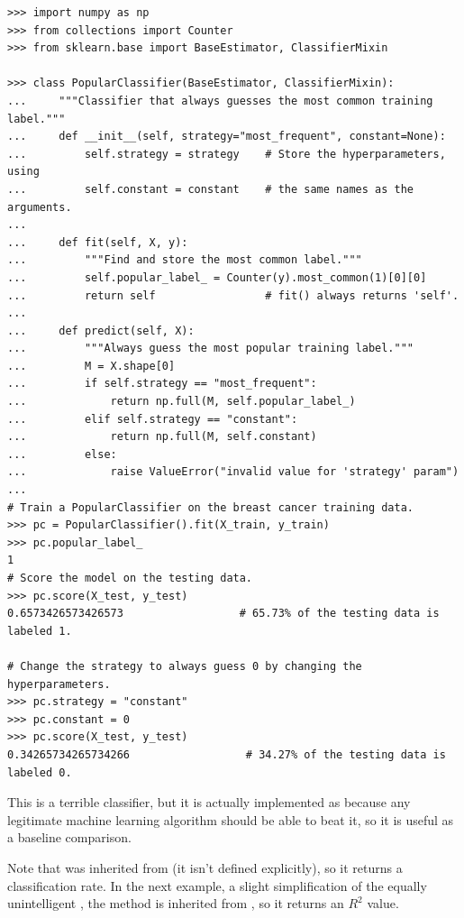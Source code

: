\begin{lstlisting}
>>> import numpy as np
>>> from collections import Counter
>>> from sklearn.base import BaseEstimator, ClassifierMixin

>>> class PopularClassifier(BaseEstimator, ClassifierMixin):
...     """Classifier that always guesses the most common training label."""
...     def __init__(self, strategy="most_frequent", constant=None):
...         self.strategy = strategy    # Store the hyperparameters, using
...         self.constant = constant    # the same names as the arguments.
...
...     def fit(self, X, y):
...         """Find and store the most common label."""
...         self.popular_label_ = Counter(y).most_common(1)[0][0]
...         return self                 # fit() always returns 'self'.
...
...     def predict(self, X):
...         """Always guess the most popular training label."""
...         M = X.shape[0]
...         if self.strategy == "most_frequent":
...             return np.full(M, self.popular_label_)
...         elif self.strategy == "constant":
...             return np.full(M, self.constant)
...         else:
...             raise ValueError("invalid value for 'strategy' param")
...
# Train a PopularClassifier on the breast cancer training data.
>>> pc = PopularClassifier().fit(X_train, y_train)
>>> pc.popular_label_
1
# Score the model on the testing data.
>>> pc.score(X_test, y_test)
0.6573426573426573                  # 65.73% of the testing data is labeled 1.

# Change the strategy to always guess 0 by changing the hyperparameters.
>>> pc.strategy = "constant"
>>> pc.constant = 0
>>> pc.score(X_test, y_test)
0.34265734265734266                  # 34.27% of the testing data is labeled 0.
\end{lstlisting}

This is a terrible classifier, but it is actually implemented as  because any legitimate machine learning algorithm should be able to beat it, so it is useful as a baseline comparison.

Note that  was inherited from  (it isn't defined explicitly), so it returns a classification rate.
In the next example, a slight simplification of the equally unintelligent , the  method is inherited from , so it returns an $R^2$ value.

\newpage

